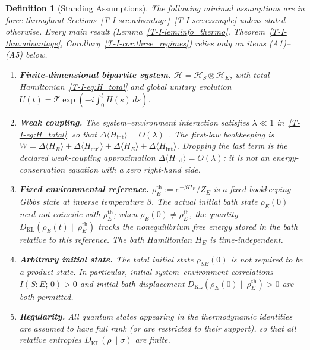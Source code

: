 \documentclass[12pt,a4paper,openany]{book}
\newtheorem{definition}[theorem]{Definition}
\begin{document}
\begin{definition}[Standing Assumptions]
\label{T-I-def:assumptions}
The following minimal assumptions are in force throughout
Sections~\ref{T-I-sec:advantage}--\ref{T-I-sec:example} unless
stated otherwise.
Every main result
(Lemma~\ref{T-I-lem:info_thermo},
Theorem~\ref{T-I-thm:advantage},
Corollary~\ref{T-I-cor:three_regimes})
relies \emph{only} on items
\textup{(A1)--(A5)} below.
\begin{enumerate}
\item[\textup{(A1)}]
  \textbf{Finite-dimensional bipartite system.}
  $\mathcal{H} = \mathcal{H}_S \otimes \mathcal{H}_E$,
  with total Hamiltonian~\eqref{T-I-eq:H_total}
  and global unitary evolution
  $U(t) = \mathcal{T}\exp(-i\int_0^t H(s)\,ds)$.

\item[\textup{(A2)}]
  \textbf{Weak coupling.}
  The system--environment interaction satisfies
  $\lambda \ll 1$ in~\eqref{T-I-eq:H_total}, so that
  $\Delta\langle H_{\mathrm{int}} \rangle
  = O(\lambda)$~\cite{BreuerPetruccione2002}.
  The first-law bookkeeping is
  $W=\Delta\langle H_R\rangle
  + \Delta\langle H_{\mathrm{ctrl}}\rangle
  + \Delta\langle H_E\rangle
  + \Delta\langle H_{\mathrm{int}}\rangle$.
  Dropping the last term is the declared weak-coupling approximation
  $\Delta\langle H_{\mathrm{int}}\rangle=O(\lambda)$; it is not
  an energy-conservation equation with a zero right-hand side.

\item[\textup{(A3)}]
  \textbf{Fixed environmental reference.}
  $\rho_E^{\mathrm{th}} := e^{-\beta H_E}/Z_E$
  is a fixed \emph{bookkeeping} Gibbs state at inverse
  temperature $\beta$.
  The \emph{actual} initial bath state $\rho_E(0)$
  need not coincide with $\rho_E^{\mathrm{th}}$;
  when $\rho_E(0) \neq \rho_E^{\mathrm{th}}$, the quantity
  $D_{\mathrm{KL}}(\rho_E(t)\|\rho_E^{\mathrm{th}})$
  tracks the nonequilibrium free energy stored in the bath
  relative to this reference.
  The bath Hamiltonian $H_E$ is time-independent.

\item[\textup{(A4)}]
  \textbf{Arbitrary initial state.}
  The total initial state $\rho_{SE}(0)$ is \emph{not}
  required to be a product state.
  In particular, initial system--environment correlations
  $I(S{:}E;\,0) > 0$ and initial bath displacement
  $D_{\mathrm{KL}}(\rho_E(0)\|\rho_E^{\mathrm{th}}) > 0$
  are both permitted.
\item[\textup{(A5)}]
  \textbf{Regularity.}
  All quantum states appearing in the thermodynamic
  identities are assumed to have full rank (or are
  restricted to their support), so that all relative
  entropies $D_{\mathrm{KL}}(\rho\|\sigma)$ are finite.
\end{enumerate}
\end{definition}
\end{document}
